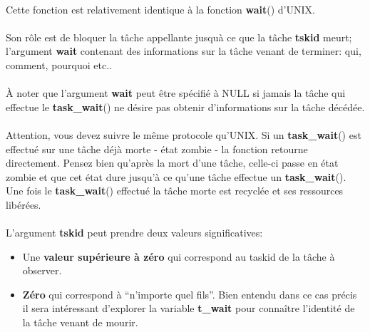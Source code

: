 \documentclass[10pt,a4wide]{article}
\begin{document}
\paragraph{}

Cette fonction est relativement identique \`a la fonction \textbf{wait}()
d'UNIX.

\paragraph{}

Son r\^ole est de bloquer la t\^ache appellante jusqu\`a ce que la
t\^ache \textbf{tskid} meurt; l'argument \textbf{wait} contenant des
informations sur la t\^ache venant de terminer: qui, comment, pourquoi etc..

\paragraph{}

\`A noter que l'argument \textbf{wait} peut \^etre sp\'ecifi\'e \`a NULL
si jamais la t\^ache qui effectue le \textbf{task\_wait}() ne d\'esire
pas obtenir d'informations sur la t\^ache d\'ec\'ed\'ee.

\paragraph{}

Attention, vous devez suivre le m\^eme protocole qu'UNIX. Si un
\textbf{task\_wait}() est effectu\'e sur une t\^ache d\'ej\`a morte -
\'etat zombie - la fonction retourne directement. Pensez bien qu'apr\`es
la mort d'une t\^ache, celle-ci passe en \'etat zombie et que cet \'etat
dure jusqu'\`a ce qu'une t\^ache effectue un \textbf{task\_wait}(). Une fois
le \textbf{task\_wait}() effectu\'e la t\^ache morte est recycl\'ee
et ses ressources lib\'er\'ees.

\paragraph{}

L'argument \textbf{tskid} peut prendre deux valeurs significatives:

\begin{itemize}

\item Une \textbf{valeur sup\'erieure \`a z\'ero} qui correspond au taskid de
      la t\^ache \`a observer.

\item \textbf{Z\'ero} qui correspond \`a ``n'importe quel fils''. Bien entendu
      dans ce cas pr\'ecis il sera int\'eressant d'explorer la variable
      \textbf{t\_wait} pour conna\^itre l'identit\'e de la t\^ache venant
      de mourir.

\end{itemize}
\end{document}
